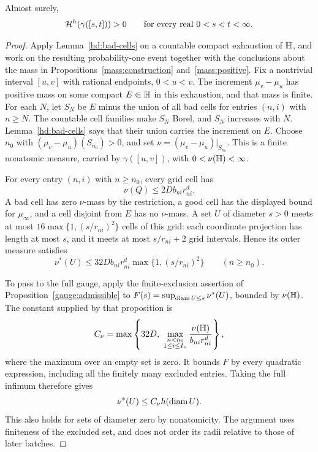 \begin{proposition}
\label{hd:lower}
Almost surely,
\[
 \mathcal H^h(\gamma([s,t]))>0
 \qquad\text{for every real }0<s<t<\infty.
\]
\end{proposition}

\begin{proof}
Apply Lemma~\ref{hd:bad-cells} on a countable compact exhaustion of
\(\mathbb H\), and work on the resulting probability-one event together
with the conclusions about the mass in
Propositions~\ref{mass:construction} and~\ref{mass:positive}.
Fix a nontrivial interval \([u,v]\) with rational endpoints,
\(0<u<v\).
The increment \(\mu_v-\mu_u\) has positive mass on some compact
\(E\Subset\mathbb H\) in this exhaustion, and that mass is finite.
For each $N$, let $S_N$ be $E$ minus the union of all bad cells for
entries $(n,i)$ with $n\ge N$. The countable cell families make $S_N$
Borel, and $S_N$ increases with $N$. Lemma~\ref{hd:bad-cells} says
that their union carries the increment on $E$. Choose $n_0$ with
$(\mu_v-\mu_u)(S_{n_0})>0$, and set
$\nu=(\mu_v-\mu_u)|_{S_{n_0}}$. This is a finite nonatomic measure,
carried by $\gamma([u,v])$, with $0<\nu(\mathbb H)<\infty$.

For every entry \((n,i)\) with \(n\ge n_0\), every grid cell has
\[
 \nu(Q)\le2D b_{ni}r_{ni}^d.
\]
A bad cell has zero \(\nu\)-mass by the restriction, a good cell
has the displayed bound for \(\mu_\infty\), and a cell disjoint
from \(E\) has no \(\nu\)-mass. A set \(U\) of diameter \(s>0\)
meets at most
\(16\max\{1,(s/r_{ni})^2\}\) cells of this grid: each coordinate
projection has length at most \(s\), and it meets at most
\(s/r_{ni}+2\) grid intervals. Hence its outer measure satisfies
\begin{equation}
 \nu^*(U)\le
 32D b_{ni}r_{ni}^d
       \max\{1,(s/r_{ni})^2\}
 \qquad(n\ge n_0).
 \label{hd:retained-density}
\end{equation}

To pass to the full gauge, apply the finite-exclusion assertion of
Proposition~\ref{gauge:admissible} to
$F(s)=\sup_{\operatorname{diam} U\le s}\nu^*(U)$, bounded by $\nu(\mathbb H)$.
The constant supplied by that proposition is
\[
 C_\nu=\max\left\{32D,\
       \max_{\substack{n<n_0\\1\le i\le I_n}}
          \frac{\nu(\mathbb H)}{b_{ni}r_{ni}^d}\right\},
\]
where the maximum over an empty set is zero.
It bounds $F$ by every quadratic expression, including all the
finitely many excluded entries. Taking the full infimum therefore gives
\begin{equation}
 \nu^*(U)\le C_\nu h(\operatorname{diam} U).
 \label{hd:full-density}
\end{equation}
This also holds for sets of diameter zero by nonatomicity.
The argument uses finiteness of the excluded set, and does not
order its radii relative to those of later batches.


\end{proof}
